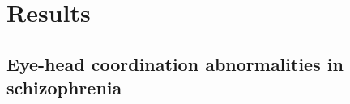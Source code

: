 \chapter{Results}
\label{chap:results}

\section{Eye-head coordination abnormalities in schizophrenia}


